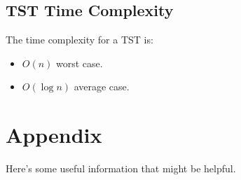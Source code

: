 \documentclass[letterpaper]{article}
\begin{document}
\subsection{TST Time Complexity}
The time complexity for a TST is: 
\begin{itemize}
    \item $O(n)$ worst case. 
    \item $O(\log n)$ average case. 
\end{itemize}








\newpage 
\section{Appendix}
Here's some useful information that might be helpful. 
\end{document}
